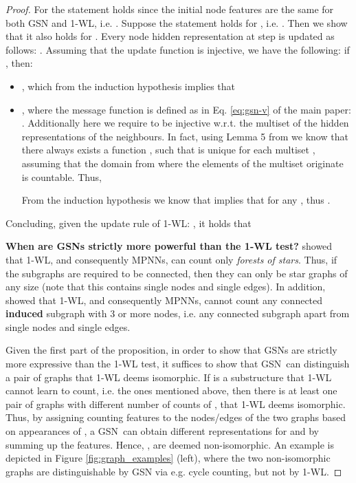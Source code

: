\documentclass{article} \usepackage{iclr2021_conference,times}
\newcommand{\modelname}{GSN}
\begin{document}
\begin{proof}
For  the statement holds since the initial node features are the same for both GSN and 1-WL, i.e. . Suppose the statement holds for , i.e. . Then we show that it also holds for . Every node hidden representation at step  is updated as follows: . Assuming that the update function  is injective, we have the following: if , then:
\begin{itemize}[wide, labelwidth=!, labelindent=0pt]
\item , which from the induction hypothesis implies that  
\item , where the message function is defined as in Eq. \ref{eq:gsn-v} of the main paper: . Additionally here we require  to be injective w.r.t. the multiset of the hidden representations of the neighbours. In fact, using Lemma 5 from \cite{xu2018how} we know that there always exists a function , such that  is unique for each multiset , assuming that the domain from where the elements of the multiset originate is countable. Thus, 



From the induction hypothesis we know that   implies that  for any  , thus .
\end{itemize}
Concluding, given the update rule of 1-WL: , it holds that 

\noindent\textbf{{When are GSNs strictly more powerful than the 1-WL test?}} \cite{DBLP:conf/fct/ArvindFKV19} showed that 1-WL, and consequently MPNNs, can count only \textit{forests of stars}. Thus, if the subgraphs are required to be connected, then they can only be star graphs of any size (note that this contains single nodes and single edges). In addition, \cite{chen2020can} showed that 1-WL, and consequently MPNNs, cannot count any connected \textbf{induced} subgraph with 3 or more nodes, i.e. any connected subgraph apart from single nodes and single edges. 
 
 Given the first part of the proposition, in order to show that \modelname s are strictly more expressive than the 1-WL test, it suffices to show that \modelname\ can distinguish a pair of graphs that 1-WL deems isomorphic. If  is a substructure that 1-WL cannot learn to count, i.e. the ones mentioned above, then there is at least one pair of graphs with different number of counts of , that 1-WL deems isomorphic. Thus, by assigning counting features to the nodes/edges of the two graphs based on appearances of , a \modelname \ can obtain different representations for  and  by summing up the features. Hence, ,  are deemed non-isomorphic. An example is depicted in Figure \ref{fig:graph_examples} (left), where the two  non-isomorphic graphs are distinguishable by GSN via e.g. cycle counting, but not by 1-WL.
\end{proof}
\end{document}
